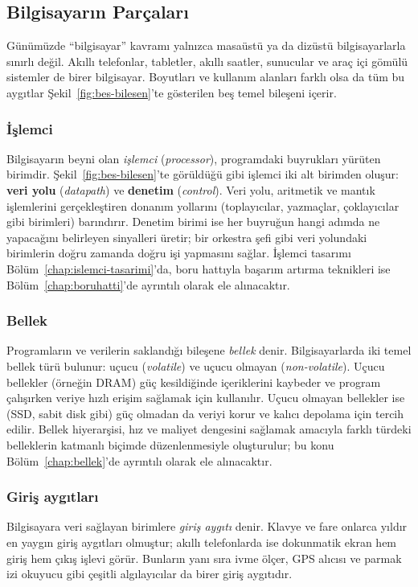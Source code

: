\subsection{Bilgisayarın Parçaları}
\label{sec:bilgisayar-parcalari}

Günümüzde ``bilgisayar'' kavramı yalnızca masaüstü ya da dizüstü bilgisayarlarla sınırlı değil. Akıllı telefonlar, tabletler, akıllı saatler, sunucular ve araç içi gömülü sistemler de birer bilgisayar. Boyutları ve kullanım alanları farklı olsa da tüm bu aygıtlar Şekil~\ref{fig:bes-bilesen}'te gösterilen beş temel bileşeni içerir.

\subsubsection*{İşlemci}
Bilgisayarın beyni olan \emph{işlemci} (\emph{processor}), programdaki buyrukları yürüten birimdir. Şekil~\ref{fig:bes-bilesen}'te görüldüğü gibi işlemci iki alt birimden oluşur: \textbf{veri yolu} (\emph{datapath}) ve \textbf{denetim} (\emph{control}). Veri yolu, aritmetik ve mantık işlemlerini gerçekleştiren donanım yollarını (toplayıcılar, yazmaçlar, çoklayıcılar gibi birimleri) barındırır. Denetim birimi ise her buyruğun hangi adımda ne yapacağını belirleyen sinyalleri üretir; bir orkestra şefi gibi veri yolundaki birimlerin doğru zamanda doğru işi yapmasını sağlar. İşlemci tasarımı Bölüm~\ref{chap:islemci-tasarimi}'da, boru hattıyla başarım artırma teknikleri ise Bölüm~\ref{chap:boruhatti}'de ayrıntılı olarak ele alınacaktır.

\subsubsection*{Bellek}
Programların ve verilerin saklandığı bileşene \emph{bellek} denir. Bilgisayarlarda iki temel bellek türü bulunur: uçucu (\emph{volatile}) ve uçucu olmayan (\emph{non-volatile}). Uçucu bellekler (örneğin DRAM) güç kesildiğinde içeriklerini kaybeder ve program çalışırken veriye hızlı erişim sağlamak için kullanılır. Uçucu olmayan bellekler ise (SSD, sabit disk gibi) güç olmadan da veriyi korur ve kalıcı depolama için tercih edilir. Bellek hiyerarşisi, hız ve maliyet dengesini sağlamak amacıyla farklı türdeki belleklerin katmanlı biçimde düzenlenmesiyle oluşturulur; bu konu Bölüm~\ref{chap:bellek}'de ayrıntılı olarak ele alınacaktır.

\subsubsection*{Giriş aygıtları}
Bilgisayara veri sağlayan birimlere \emph{giriş aygıtı} denir. Klavye ve fare onlarca yıldır en yaygın giriş aygıtları olmuştur; akıllı telefonlarda ise dokunmatik ekran hem giriş hem çıkış işlevi görür. Bunların yanı sıra ivme ölçer, GPS alıcısı ve parmak izi okuyucu gibi çeşitli algılayıcılar da birer giriş aygıtıdır.

